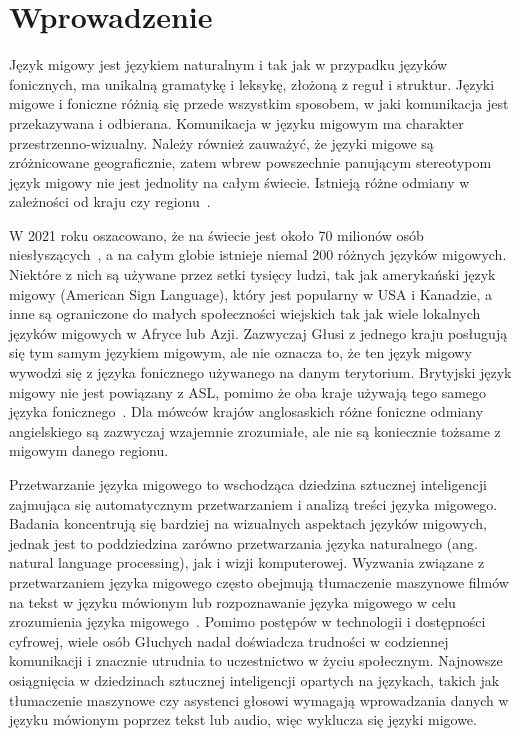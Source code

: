 \hypersetup{pageanchor=true}

\chapter{Wprowadzenie}\label{ch:introduction}

Język migowy jest językiem naturalnym i tak jak w przypadku języków fonicznych, ma unikalną gramatykę i leksykę, złożoną z reguł i struktur. Języki migowe i foniczne różnią się przede wszystkim sposobem, w jaki komunikacja jest przekazywana i odbierana. Komunikacja w języku migowym ma charakter przestrzenno-wizualny. Należy również zauważyć, że języki migowe są zróżnicowane geograficznie, zatem wbrew powszechnie panującym stereotypom język migowy nie jest jednolity na całym świecie. Istnieją różne odmiany w zależności od kraju czy regionu~\cite{stokoe1980}.

W 2021 roku oszacowano, że na świecie jest około 70 milionów osób niesłyszących~\cite{who2021}, a na całym globie istnieje niemal 200 różnych języków migowych. Niektóre z nich są używane przez setki tysięcy ludzi, tak jak amerykański język migowy (American Sign Language), który jest popularny w USA i Kanadzie, a inne są ograniczone do małych społeczności wiejskich tak jak wiele lokalnych języków migowych w Afryce lub Azji. Zazwyczaj Głusi z jednego kraju posługują się tym samym językiem migowym, ale nie oznacza to, że ten język migowy wywodzi się z języka fonicznego używanego na danym terytorium. Brytyjski język migowy nie jest powiązany z ASL, pomimo że oba kraje używają tego samego języka fonicznego~\cite{rutkowski2016}. Dla mówców krajów anglosaskich różne foniczne odmiany angielskiego są zazwyczaj wzajemnie zrozumiałe, ale nie są koniecznie tożsame z migowym danego regionu.

Przetwarzanie języka migowego to wschodząca dziedzina sztucznej inteligencji zajmująca się automatycznym przetwarzaniem i analizą treści języka migowego. Badania koncentrują się bardziej na wizualnych aspektach języków migowych, jednak jest to poddziedzina zarówno przetwarzania języka naturalnego (ang. natural language processing), jak i wizji komputerowej. Wyzwania związane z przetwarzaniem języka migowego często obejmują tłumaczenie maszynowe filmów na tekst w języku mówionym lub rozpoznawanie języka migowego w celu zrozumienia języka migowego~\cite{bragg2019}. Pomimo postępów w technologii i dostępności cyfrowej, wiele osób Głuchych nadal doświadcza trudności w codziennej komunikacji i znacznie utrudnia to uczestnictwo w życiu społecznym. Najnowsze osiągnięcia w dziedzinach sztucznej inteligencji opartych na językach, takich jak tłumaczenie maszynowe czy asystenci głosowi wymagają wprowadzania danych w języku mówionym poprzez tekst lub audio, więc wyklucza się języki migowe.




